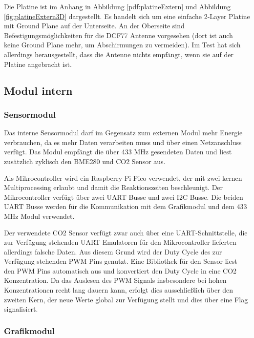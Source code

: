 \documentclass[a4paper,11pt]{article}
\newcounter{subsubsubsection}[subsubsection]
\begin{document}
\label{subsubsubsub:platineExtern}

Die Platine ist im Anhang in \hyperref[pdf:platineExtern]{Abbildung \ref{pdf:platineExtern}} und \hyperref[fig:platineExtern3D]{Abbildung \ref{fig:platineExtern3D}} dargestellt. Es handelt sich um eine einfache 2-Layer Platine mit Ground Plane
auf der Unterseite. An der Oberseite sind Befestigungsmöglichkeiten für die DCF77 Antenne vorgesehen (dort ist auch keine Ground Plane mehr, um Abschirmungen zu vermeiden). 
Im Test hat sich allerdings herausgestellt, dass die Antenne nichts empfängt, wenn sie auf der Platine angebracht ist. 

\newpage
\subsection{Modul intern}
\label{subsub:modulInt}

\subsubsection{Sensormodul}
\label{subsubsub:sensormodulInt}

Das interne Sensormodul darf im Gegensatz zum externen Modul mehr Energie verbrauchen, da es mehr Daten verarbeiten muss und über einen Netzanschluss verfügt. 
Das Modul empfängt die über 433 MHz gesendeten Daten und liest zusätzlich zyklisch den BME280 und CO2 Sensor aus.

\vspace{0.3cm}
\noindent
Als Mikrocontroller wird ein Raspberry Pi Pico verwendet, der mit zwei kernen Multiprocessing erlaubt und damit die Reaktionszeiten beschleunigt. Der Mikrocontroller
verfügt über zwei UART Busse und zwei I2C Busse. Die beiden UART Busse werden für die Kommunikation mit dem Grafikmodul und dem 433 MHz Modul verwendet.

Der verwendete CO2 Sensor verfügt zwar auch über eine UART-Schnittstelle, die zur Verfügung stehenden UART Emulatoren für den Mikrocontroller lieferten allerdings
falsche Daten. Aus diesem Grund wird der Duty Cycle des zur Verfügung stehenden PWM Pins genutzt. 
Eine Bibliothek für den Sensor liest den PWM Pins automatisch aus und konvertiert den Duty Cycle in eine CO2 Konzentration. Da das Auslesen des PWM Signals insbesondere bei hohen
Konzentrationen recht lang dauern kann, erfolgt dies ausschließlich über den zweiten Kern, der neue Werte global zur Verfügung stellt und dies über eine Flag signalisiert. 

\subsubsection{Grafikmodul}
\label{subsubsub:grafikmodulInt}
\end{document}
